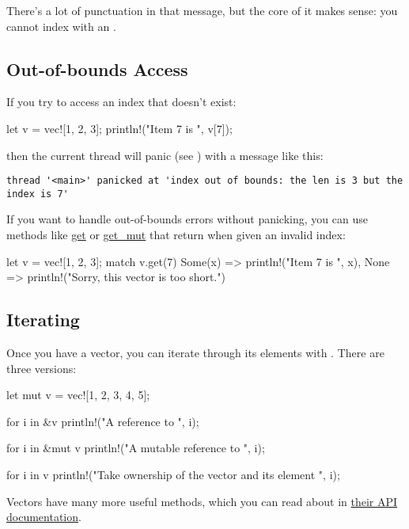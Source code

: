 There's a lot of punctuation in that message, but the core of it makes sense: you cannot index with an \itt.

\subsection*{Out-of-bounds Access}

If you try to access an index that doesn't exist:

\begin{rustc}
let v = vec![1, 2, 3];
println!("Item 7 is {}", v[7]);
\end{rustc}

then the current thread will panic (see ) with a message like this:

\begin{verbatim}
thread '<main>' panicked at 'index out of bounds: the len is 3 but the index is 7'
\end{verbatim}

If you want to handle out-of-bounds errors without panicking, you can use methods like 
\href{http://doc.rust-lang.org/std/vec/struct.Vec.html#method.get}{get} or 
\href{http://doc.rust-lang.org/std/vec/struct.Vec.html#method.get_mut}{get\_mut} that return  when given an invalid index:

\begin{rustc}
let v = vec![1, 2, 3];
match v.get(7) {
    Some(x) => println!("Item 7 is {}", x),
    None => println!("Sorry, this vector is too short.")
}
\end{rustc}

\subsection*{Iterating}

Once you have a vector, you can iterate through its elements with . There are three versions:

\begin{rustc}
let mut v = vec![1, 2, 3, 4, 5];

for i in &v {
    println!("A reference to {}", i);
}

for i in &mut v {
    println!("A mutable reference to {}", i);
}

for i in v {
    println!("Take ownership of the vector and its element {}", i);
}
\end{rustc}

Vectors have many more useful methods, which you can read about in \href{https://doc.rust-lang.org/std/vec/}{their API documentation}.
